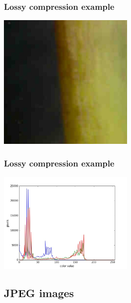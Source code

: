 \documentclass{beamer}
\begin{document}
\begin{frame}
	\frametitle{Lossy compression example}

	\begin{center}
	\includegraphics[width=0.5\textwidth]{../../fig/01-quality-jpg.jpg}
	\end{center}

\end{frame}

\begin{frame}
	\frametitle{Lossy compression example}

	\begin{center}
	\includegraphics[width=0.5\textwidth]{../../fig/01-quality-jpg-histogram.jpeg}
	\end{center}

\end{frame}

\subsection{JPEG images}
\end{document}
